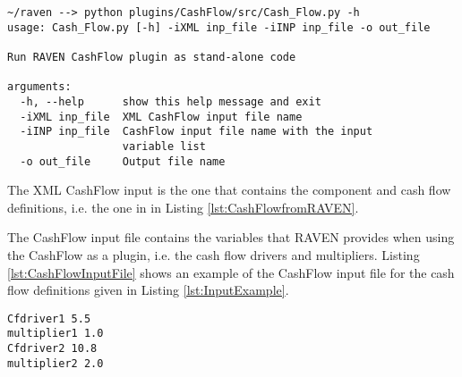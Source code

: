 \small
\begin{lstlisting}[caption=CashFlow run as stand-alone python code, label=lst:CashFlowAsCode]
~/raven --> python plugins/CashFlow/src/Cash_Flow.py -h
usage: Cash_Flow.py [-h] -iXML inp_file -iINP inp_file -o out_file

Run RAVEN CashFlow plugin as stand-alone code

arguments:
  -h, --help      show this help message and exit
  -iXML inp_file  XML CashFlow input file name
  -iINP inp_file  CashFlow input file name with the input 
                  variable list
  -o out_file     Output file name
\end{lstlisting}
\normalsize

The XML CashFlow input is the one that contains the component and cash flow definitions, i.e. the one in  in Listing \ref{lst:CashFlowfromRAVEN}.

The CashFlow input file contains the variables that RAVEN provides when using the CashFlow as a plugin, i.e. the cash flow drivers and multipliers. Listing \ref{lst:CashFlowInputFile}  shows an example of the CashFlow input file for the cash flow definitions given in Listing \ref{lst:InputExample}. 

\begin{lstlisting}[caption=CashFlow run as stand-alone python code, label=lst:CashFlowInputFile]
Cfdriver1 5.5
multiplier1 1.0
Cfdriver2 10.8
multiplier2 2.0
\end{lstlisting}
